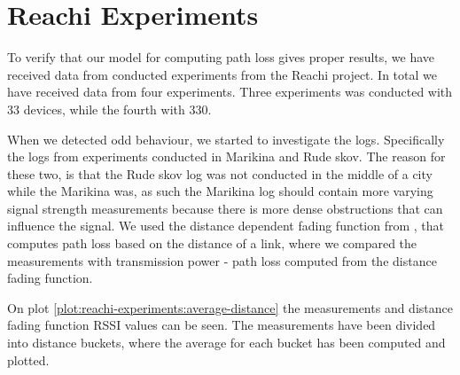 \section{Reachi Experiments}
To verify that our model for computing path loss gives proper results, we have received data from conducted
experiments from the Reachi project. In total we have received data from four experiments. Three experiments
was conducted with 33 devices, while the fourth with 330.

When we detected odd behaviour, we started to investigate the logs. Specifically the logs from experiments
conducted in Marikina and Rude skov. The reason for these two, is that the Rude skov log was not conducted in
the middle of a city while the Marikina was, as such the Marikina log should contain more varying signal
strength measurements because there is more dense obstructions that can influence the signal. We used the
distance dependent fading function from \cite{paper:linkmodel}, that computes path loss based on the distance of a
link, where we compared the measurements with transmission power - path loss computed from the distance fading
function.

On plot \ref{plot:reachi-experiments:average-distance} the measurements and distance fading function RSSI
values can be seen. The measurements have been divided into distance buckets, where the average for each
bucket has been computed and plotted.

